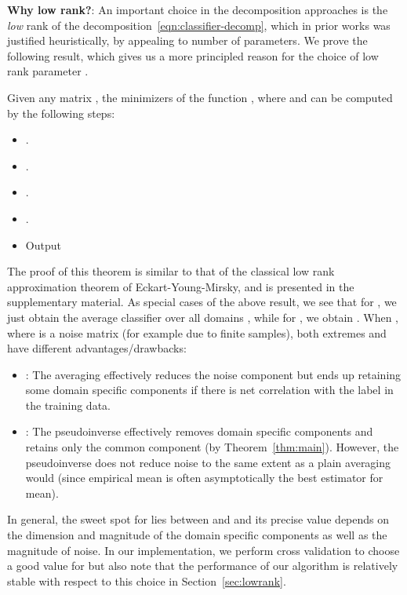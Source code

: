 \documentclass{article}
\begin{document}
\textbf{Why low rank?}: An important choice in the decomposition approaches is the \emph{low} rank of the decomposition~\eqref{eqn:classifier-decomp}, which in prior works was justified heuristically, by appealing to number of parameters.
We prove the following result, which gives us a more principled reason for the choice of low rank parameter . \begin{theorem}\label{thm:main}
Given any matrix , the minimizers of the function , where  and  can be computed by the following steps:
\begin{itemize}
    \item .
    \item .
    \item .
    \item .
    \item Output 
\end{itemize}
\end{theorem}
The proof of this theorem is similar to that of the classical low rank approximation theorem of Eckart-Young-Mirsky, and is presented in the supplementary material.
As special cases of the above result, we see that for , we just obtain the average classifier over all domains , while for , we obtain . When , where  is a noise matrix (for example due to finite samples), both extremes  and  have different advantages/drawbacks:
\begin{itemize}
    \item \textbf{}: The averaging effectively reduces the noise component  but ends up retaining some domain specific components if there is net correlation with the label in the training data.
    \item \textbf{}: The pseudoinverse effectively removes domain specific components and retains only the common component (by Theorem~\ref{thm:main}).
However, the pseudoinverse does not reduce noise to the same extent as a plain averaging would (since empirical mean is often asymptotically the best estimator for mean).
\end{itemize}
In general, the sweet spot for  lies between  and  and its precise value depends on the dimension and magnitude of the domain specific components as well as the magnitude of noise.
In our implementation, we perform cross validation to choose a good value for  but also note that the performance of our algorithm is relatively stable with respect to this choice in Section~\ref{sec:lowrank}.
\end{document}
